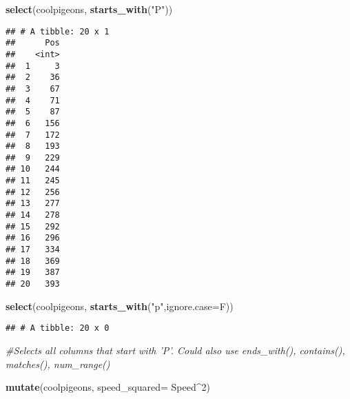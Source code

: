 \documentclass[]{article}
\newenvironment{Shaded}{\begin{snugshade}}{\end{snugshade}}
\newcommand{\KeywordTok}[1]{\textcolor[rgb]{0.13,0.29,0.53}{\textbf{#1}}}
\newcommand{\DataTypeTok}[1]{\textcolor[rgb]{0.13,0.29,0.53}{#1}}
\newcommand{\DecValTok}[1]{\textcolor[rgb]{0.00,0.00,0.81}{#1}}
\newcommand{\StringTok}[1]{\textcolor[rgb]{0.31,0.60,0.02}{#1}}
\newcommand{\CommentTok}[1]{\textcolor[rgb]{0.56,0.35,0.01}{\textit{#1}}}
\newcommand{\OperatorTok}[1]{\textcolor[rgb]{0.81,0.36,0.00}{\textbf{#1}}}
\newcommand{\NormalTok}[1]{#1}
\begin{document}
\begin{Shaded}
\begin{Highlighting}[]
\KeywordTok{select}\NormalTok{(coolpigeons, }\KeywordTok{starts_with}\NormalTok{(}\StringTok{"P"}\NormalTok{))}
\end{Highlighting}
\end{Shaded}

\begin{verbatim}
## # A tibble: 20 x 1
##      Pos
##    <int>
##  1     3
##  2    36
##  3    67
##  4    71
##  5    87
##  6   156
##  7   172
##  8   193
##  9   229
## 10   244
## 11   245
## 12   256
## 13   277
## 14   278
## 15   292
## 16   296
## 17   334
## 18   369
## 19   387
## 20   393
\end{verbatim}

\begin{Shaded}
\begin{Highlighting}[]
\KeywordTok{select}\NormalTok{(coolpigeons, }\KeywordTok{starts_with}\NormalTok{(}\StringTok{"p"}\NormalTok{,}\DataTypeTok{ignore.case=}\NormalTok{F))}
\end{Highlighting}
\end{Shaded}

\begin{verbatim}
## # A tibble: 20 x 0
\end{verbatim}

\begin{Shaded}
\begin{Highlighting}[]
\CommentTok{#Selects all columns that start with 'P'. Could also use ends_with(), contains(), matches(), num_range()}
\end{Highlighting}
\end{Shaded}

\begin{Shaded}
\begin{Highlighting}[]
\KeywordTok{mutate}\NormalTok{(coolpigeons, }\DataTypeTok{speed_squared=}\NormalTok{ Speed}\OperatorTok{^}\DecValTok{2}\NormalTok{)}
\end{Highlighting}
\end{Shaded}
\end{document}
